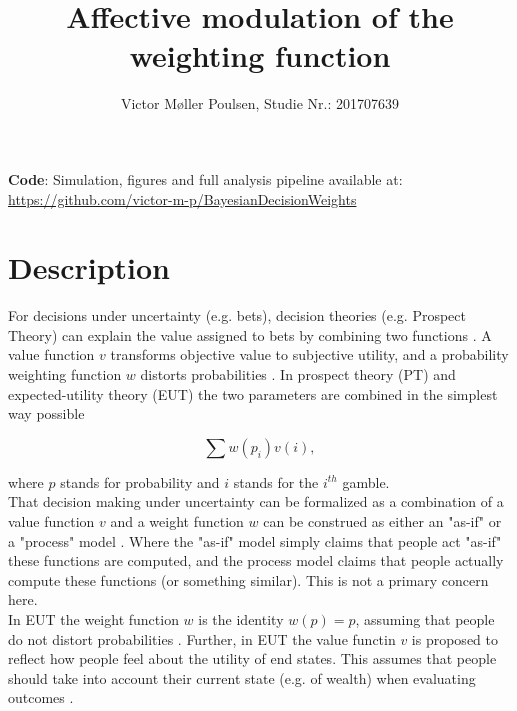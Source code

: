 \documentclass[12pt]{article}
\title{Affective modulation of the weighting function}
\author{Victor Møller Poulsen, Studie Nr.: 201707639}
\begin{document}
\maketitle
\leavevmode

\textbf{Code}: Simulation, figures and
full analysis pipeline available at: \\
\href{https://github.com/victor-m-p/BayesianDecisionWeights}
{https://github.com/victor-m-p/BayesianDecisionWeights}

\tableofcontents

\section{Description}

For decisions under uncertainty
(e.g. bets), decision theories
(e.g. Prospect Theory) can explain the
value assigned to bets by combining two functions
\autocite{rottenstreich2001money}.
A value function $v$ transforms objective value to
subjective utility, and a probability
weighting function $w$
distorts probabilities \autocite{rottenstreich2001money,
gonzalez1999shape}.
In prospect theory (PT)
and expected-utility theory (EUT) the two parameters
are combined in
the simplest way possible
\autocite{rottenstreich2001money}

\[
	\sum w(p_i)v(i),
\]

where $p$ stands for probability and $i$ stands for the
$i^{th}$ gamble. \\

That decision making under uncertainty can
be formalized as a combination of a value
function $v$ and a weight function  $w$
can be construed
as either an "as-if" or a "process" model
\autocite{newell2015straight}. Where the
"as-if" model simply claims that people act
"as-if" these functions are computed, and the
process model claims that people actually compute
these functions (or something similar). This
is not a primary concern here. \\

In EUT the weight function $w$
is the identity $w(p) = p$, assuming that people do
not distort probabilities \autocite{rottenstreich2001money}.
Further, in EUT the value functin $v$ is
proposed to reflect how people feel about
the utility of end states. This assumes that people should
take into account their current state (e.g. of wealth)
when evaluating outcomes
\autocite{newell2015straight}.

\vspace{3mm}
\end{document}
